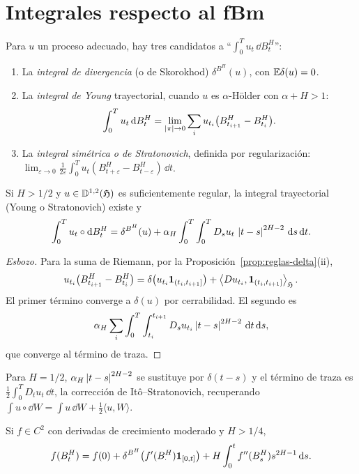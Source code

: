 \section{Integrales respecto al fBm}
Para $u$ un proceso adecuado, hay tres candidatos a ``$\int_0^Tu_t\,\dd B^H_t$'':
\begin{enumerate}
  \item La \emph{integral de divergencia} (o de Skorokhod) $\delta^{B^H}(u)$, con $\mathbb{E}\delta(u)=0$.
  \item La \emph{integral de Young} trayectorial, cuando $u$ es $\alpha$-Hölder con $\alpha+H>1$:
  \[
    \int_0^Tu_t\,\mathrm{d} B^H_t=\lim_{\left\lvert \pi\right\rvert\to0}\sum_iu_{t_i}\big(B^H_{t_{i+1}}-B^H_{t_i}\big).
  \]
  \item La \emph{integral simétrica o de Stratonovich}, definida por regularización: $\lim_{\varepsilon\to0}\frac1{2\varepsilon}\int_0^Tu_t(B^H_{t+\varepsilon}-
  B^H_{t-\varepsilon})\,\dd t$.
\end{enumerate}

\begin{teorema}
Si $H>1/2$ y $u\in\mathbb{D}^{1,2}(\mathfrak{H})$ es
suficientemente regular, la integral trayectorial (Young o Stratonovich) existe y
\[
  \int_0^Tu_t\circ\mathrm{d} B^H_t=\delta^{B^H}(u)+\alpha_H\int_0^T\int_0^TD_su_t\,\left\lvert t-s\right\rvert^{2H-2}\,\mathrm{d} s\,\mathrm{d} t.
\]
\end{teorema}

\begin{proof}[Esbozo]
Para la suma de Riemann, por la Proposición~\ref{prop:reglas-delta}(ii),
\[
  u_{t_i}\big(B^H_{t_{i+1}}-B^H_{t_i}\big)=\delta\big(u_{t_i}\mathbf{1}_{(t_i,t_{i+1}]}\big)+\left\langle Du_{t_i}, \mathbf{1}_{(t_i,t_{i+1}]}\right\rangle_{\mathfrak{H}}.
\]
El primer término converge a $\delta(u)$ por cerrabilidad. El segundo es
\[
  \alpha_H\sum_i\int_0^T\int_{t_i}^{t_{i+1}}D_su_{t_i}\left\lvert t-s\right\rvert^{2H-2}\,\mathrm{d} t\,\mathrm{d} s,
\]
que converge al término de traza.
\end{proof}

Para $H=1/2$, $\alpha_H\left\lvert t-s\right\rvert^{2H-2}$ se sustituye por $\delta(t-s)$ y el término de traza es $\frac12\int_0^TD_tu_t\,\dd t$,
la corrección de Itô--Stratonovich, recuperando $\int u\circ\dd W=\int u\,\dd W+\frac12\langle u,W\rangle$.

\begin{teorema}
Si $f\in C^2$ con derivadas de crecimiento
moderado y $H>1/4$,
\[
  f(B^H_t)=f(0)+\delta^{B^H}\big(f'(B^H_\cdot)\mathbf{1}_{[0,t]}\big)+H\int_0^tf''(B^H_s)s^{2H-1}\,\mathrm{d} s.
\]
\end{teorema}

